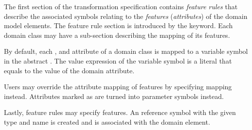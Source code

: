 The first section of the transformation specification contains \emph{feature rules} that describe the associated symbols relating to the \emph{features} (\emph{attributes}) of the domain model elements. The feature rule section is introduced by the  keyword. Each domain class may have a sub-section describing the mapping of its features.

By default, each ,  and  attribute of a domain class is mapped to a  variable symbol in the abstract . The value expression of the variable symbol is a literal that equals to the value of the domain attribute.

Users may override the attribute mapping of  features by specifying  mapping instead. Attributes marked as  are turned into parameter symbols instead.

Lastly, feature rules may specify  features. An  reference symbol with the given type and name is created and is associated with the domain element.

